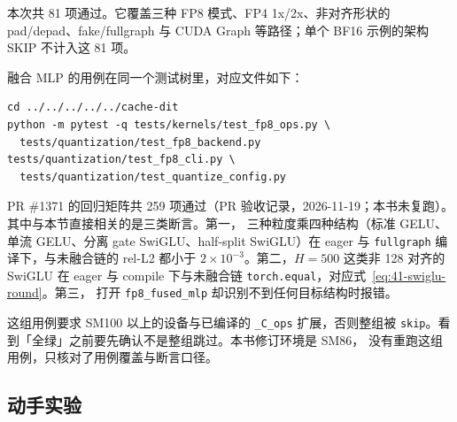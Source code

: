 本次共 81 项通过。它覆盖三种 FP8 模式、FP4 1x/2x、非对齐形状的
pad/depad、fake/fullgraph 与 CUDA Graph 等路径；单个 BF16 示例的架构 SKIP
不计入这 81 项。

融合 MLP 的用例在同一个测试树里，对应文件如下：

\begin{lstlisting}[style=console]
cd ../../../../../cache-dit
python -m pytest -q tests/kernels/test_fp8_ops.py \
  tests/quantization/test_fp8_backend.py tests/quantization/test_fp8_cli.py \
  tests/quantization/test_quantize_config.py
\end{lstlisting}

PR \#1371 的回归矩阵共 259 项通过（PR 验收记录，2026-11-19；本书未复跑）。
其中与本节直接相关的是三类断言。第一，
三种粒度乘四种结构（标准 GELU、单流 GELU、分离 gate SwiGLU、half-split
SwiGLU）在 eager 与 \texttt{fullgraph} 编译下，与未融合链的 rel-L2 都小于
$2\times10^{-3}$。第二，$H=500$ 这类非 128 对齐的 SwiGLU 在 eager 与 compile
下与未融合链 \texttt{torch.equal}，对应式~\ref{eq:41-swiglu-round}。第三，
打开 \texttt{fp8\_fused\_mlp} 却识别不到任何目标结构时报错。

这组用例要求 SM100 以上的设备与已编译的 \texttt{\_C\_ops} 扩展，否则整组被
\texttt{skip}。看到「全绿」之前要先确认不是整组跳过。本书修订环境是 SM86，
没有重跑这组用例，只核对了用例覆盖与断言口径。

\subsection{动手实验}

